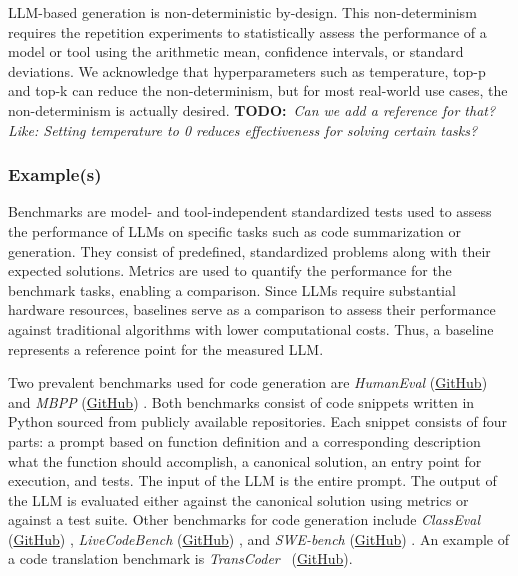 \documentclass[11pt]{article}
\newcommand{\todo}[1]{{\textbf{TODO:}\ \textit{#1}}} %
\begin{document}
LLM-based generation is non-deterministic by-design.
This non-determinism requires the repetition experiments to statistically assess the performance of a model or tool using the arithmetic mean, confidence intervals, or standard deviations.
We acknowledge that hyperparameters such as temperature, top-p and top-k can reduce the non-determinism, but for most real-world use cases, the non-determinism is actually desired.
\todo{Can we add a reference for that? Like: Setting temperature to 0 reduces effectiveness for solving certain tasks?}


\subsubsection{Example(s)}

Benchmarks are model- and tool-independent standardized tests used to assess the performance of LLMs on specific tasks such as code summarization or generation.
They consist of predefined, standardized problems along with their expected solutions.
Metrics are used to quantify the performance for the benchmark tasks, enabling a comparison.
Since LLMs require substantial hardware resources, baselines serve as a comparison to assess their performance against traditional algorithms with lower computational costs.
Thus, a baseline represents a reference point for the measured LLM.

Two prevalent benchmarks used for code generation are \emph{HumanEval} (\href{https://github.com/openai/human-eval}{GitHub}) \cite{DBLP:conf/acl/PapineniRWZ02} and \emph{MBPP} (\href{https://huggingface.co/datasets/google-research-datasets/mbpp}{GitHub}) \cite{DBLP:journals/corr/abs-2108-07732}.
Both benchmarks consist of code snippets written in Python sourced from publicly available repositories.
Each snippet consists of four parts: a prompt based on function definition and a corresponding description what the function should accomplish, a canonical solution, an entry point for execution, and tests.
The input of the LLM is the entire prompt.
The output of the LLM is evaluated either against the canonical solution using metrics or against a test suite.
Other benchmarks for code generation include \emph{ClassEval} (\href{https://github.com/openai/human-eval}{GitHub}) \cite{DBLP:journals/corr/abs-2308-01861}, \emph{LiveCodeBench} (\href{https://github.com/LiveCodeBench/LiveCodeBench}{GitHub}) \cite{DBLP:journals/corr/abs-2403-07974}, and \emph{SWE-bench} (\href{https://github.com/swe-bench/SWE-bench}{GitHub}) \cite{DBLP:conf/iclr/JimenezYWYPPN24}.
An example of a code translation benchmark is \emph{TransCoder}~\cite{DBLP:journals/corr/abs-2006-03511} (\href{https://github.com/facebookresearch/CodeGen}{GitHub}). 
\end{document}
